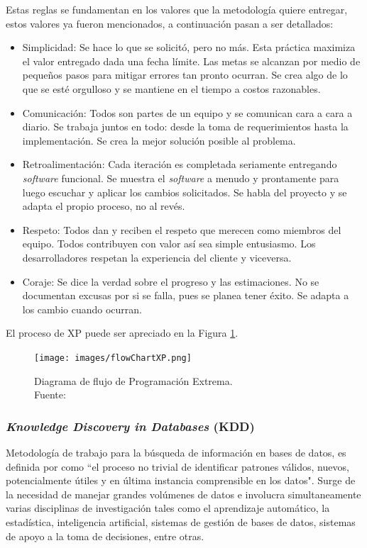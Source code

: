 Estas reglas se fundamentan en los valores que la metodología quiere entregar, estos valores ya fueron mencionados, a continuación pasan a ser detallados:

\begin{itemize}
\item Simplicidad: Se hace lo que se solicitó, pero no más. Esta práctica maximiza el valor entregado dada una fecha límite. Las metas se alcanzan por medio de pequeños pasos para mitigar errores tan pronto ocurran. Se crea algo de lo que se esté orgulloso y se mantiene en el tiempo a costos razonables.
\item Comunicación: Todos son partes de un equipo y se comunican cara a cara a diario. Se trabaja juntos en todo: desde la toma de requerimientos hasta la implementación. Se crea la mejor solución posible al problema.
\item Retroalimentación: Cada iteración es completada seriamente entregando \textit{software} funcional. Se muestra el \textit{software} a menudo y prontamente para luego escuchar y aplicar los cambios solicitados. Se habla del proyecto y se adapta el propio proceso, no al revés.
\item Respeto: Todos dan y reciben el respeto que merecen como miembros del equipo. Todos contribuyen con valor así sea simple entusiasmo. Los desarrolladores respetan la experiencia del cliente y viceversa. 
\item Coraje: Se dice la verdad sobre el progreso y las estimaciones. No se documentan excusas por si se falla, pues se planea tener éxito. Se adapta a los cambio cuando ocurran.
\end{itemize}

El proceso de XP puede ser apreciado en la Figura \ref{fig:procesoXP}.

\begin{figure}[H]
	\centering
	\captionsetup{justification=centering}
	\texttt{[image: images/flowChartXP.png]}
	\caption[Diagrama de flujo de Programación Extrema.]{Diagrama de flujo de Programación Extrema.\\Fuente: \citep{XP}}
	\label{fig:procesoXP}
\end{figure}

\subsubsection*{\textit{Knowledge Discovery in Databases} (KDD)}
\label{subsubsec:kdd}

Metodología de trabajo para la búsqueda de información en bases de datos, es definida por \citep{KDDFayyad} como ``el proceso no trivial de identificar patrones válidos, nuevos, potencialmente útiles y en última instancia comprensible en los datos". Surge de la necesidad de manejar grandes volúmenes de datos e involucra simultaneamente varias disciplinas de investigación tales como el aprendizaje automático, la estadística, inteligencia artificial, sistemas de gestión de bases de datos, sistemas de apoyo a la toma de decisiones, entre otras.

